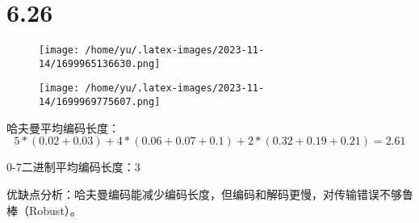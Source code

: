 \documentclass[14pt]{extarticle}
\begin{document}
\inputminted{cpp}{6.58.cpp}


\section{6.26}
\begin{figure}[H]
    \centering
    \texttt{[image: /home/yu/.latex-images/2023-11-14/1699965136630.png]}
\end{figure}

\begin{figure}[H]
    \centering
    \texttt{[image: /home/yu/.latex-images/2023-11-14/1699969775607.png]}
\end{figure}


哈夫曼平均编码长度：
\begin{equation}
    5*(0.02+0.03)+ 4*(0.06+0.07+0.1) +2*(0.32+0.19+0.21)=2.61
\end{equation}

0-7二进制平均编码长度：3


优缺点分析：哈夫曼编码能减少编码长度，但编码和解码更慢，对传输错误不够鲁棒（Robust）。
\end{document}

